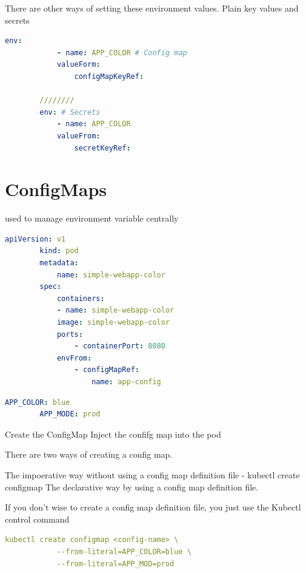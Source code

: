 \documentclass[11pt]{book}
\begin{document}
    There are other ways of setting these environment values. Plain key values and secrets

    \begin{lstlisting}[language=yaml, caption={Example pod definition file with yml}]
        env:
            - name: APP_COLOR # Config map
            valueForm:
                configMapKeyRef:

        ////////
        env: # Secrets
            - name: APP_COLOR
            valueFrom:
                secretKeyRef:

    \end{lstlisting}


    \section{ConfigMaps}

    used to manage environment variable centrally

    \begin{lstlisting}[language=yaml, caption={Example pod definition file with yml}]
        apiVersion: v1
        kind: pod
        metadata:
            name: simple-webapp-color
        spec:
            containers:
            - name: simple-webapp-color
            image: simple-webapp-color
            ports:
                - containerPort: 8080
            envFrom:
                - configMapRef:
                    name: app-config
    \end{lstlisting}

    \begin{lstlisting}[language=yaml, caption={Example pod definition file with yml}]
        APP_COLOR: blue
        APP_MODE: prod
    \end{lstlisting}

    Create the ConfigMap
    Inject the confifg map into the pod

    There are two ways of creating a config map.

    The impoerative way without using a config map definition file - kubectl create configmap
    The declarative way by using a config map definition file.

    If you don't wise to create a config map definition file, you just use the Kubectl control command

    \begin{lstlisting}[language=yaml, caption={Example pod definition file with yml}]
        kubectl create configmap <config-name> \
            --from-literal=APP_COLOR=blue \
            --from-literal=APP_MOD=prod
    \end{lstlisting}
\end{document}
